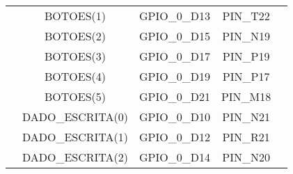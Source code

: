 \documentclass[amsmath,amssymb,floatfix]{report}
\begin{document}
\begin{table}[H]
\begin{tabular}{c|c|c|c|c|}
\multicolumn{1}{|c|}{}                           & BOTOES(1)               & GPIO\_0\_D13         & PIN\_T22                                                                                                                                                                              & \multicolumn{1}{l|}{}          \\ \cline{2-5} 
\multicolumn{1}{|c|}{}                           & BOTOES(2)               & GPIO\_0\_D15         & PIN\_N19                                                                                                                                                                              & \multicolumn{1}{l|}{}          \\ \cline{2-5} 
\multicolumn{1}{|c|}{}                           & BOTOES(3)               & GPIO\_0\_D17         & PIN\_P19                                                                                                                                                                              & \multicolumn{1}{l|}{}          \\ \cline{2-5} 
\multicolumn{1}{|c|}{}                           & BOTOES(4)               & GPIO\_0\_D19         & PIN\_P17                                                                                                                                                                              &                                \\ \cline{2-5} 
\multicolumn{1}{|c|}{}                           & BOTOES(5)               & GPIO\_0\_D21         & PIN\_M18                                                                                                                                                                              &                                \\ \cline{2-5} 
\multicolumn{1}{|c|}{}                           & DADO\_ESCRITA(0)        & GPIO\_0\_D10         & PIN\_N21                                                                                                                                                                              &   \\ \cline{2-5} 
\multicolumn{1}{|c|}{}                           & DADO\_ESCRITA(1)        & GPIO\_0\_D12         & PIN\_R21                                                                                                                                                                              &   \\ \cline{2-5} 
\multicolumn{1}{|c|}{}                           & DADO\_ESCRITA(2)        & GPIO\_0\_D14         & PIN\_N20                                                                                                                                                                              &      \\ \cline{2-5} 

\end{tabular}
\end{table}
\end{document}
